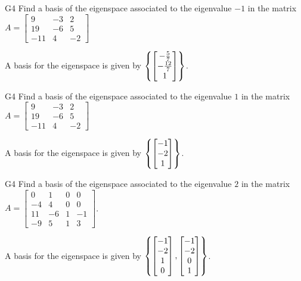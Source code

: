 \begin{problem}{G4}
Find a basis of the eigenspace associated to the eigenvalue $-1$ in the matrix $A=\begin{bmatrix}9 & -3 & 2 \\ 19 & -6 & 5 \\ -11 & 4 & -2 \end{bmatrix}$
\end{problem}
\begin{solution}
A basis for the eigenspace is given by $\left\{\begin{bmatrix} -\frac{5}{7} \\ - \frac{12}{7} \\ 1 \end{bmatrix}\right\}$.
\end{solution}

\begin{problem}{G4}
Find a basis of the eigenspace associated to the eigenvalue $1$ in the matrix $A=\begin{bmatrix}9 & -3 & 2 \\ 19 & -6 & 5 \\ -11 & 4 & -2 \end{bmatrix}$
\end{problem}
\begin{solution}
A basis for the eigenspace is given by $\left\{\begin{bmatrix} -1 \\ -2 \\ 1 \end{bmatrix}\right\}$.
\end{solution}

\begin{problem}{G4}
Find a basis of the eigenspace associated to the eigenvalue $2$ in the matrix $A=\begin{bmatrix} 0 & 1 & 0 & 0 \\ -4 & 4 & 0 & 0 \\ 11 & -6 & 1 & -1 \\ -9 & 5 & 1 & 3 \end{bmatrix}$.
\end{problem}
\begin{solution}
A basis for the eigenspace is given by $\left\{\begin{bmatrix} -1 \\ -2 \\ 1 \\ 0 \end{bmatrix},\begin{bmatrix} -1 \\ -2 \\ 0 \\ 1 \end{bmatrix}\right\}$.
\end{solution}

